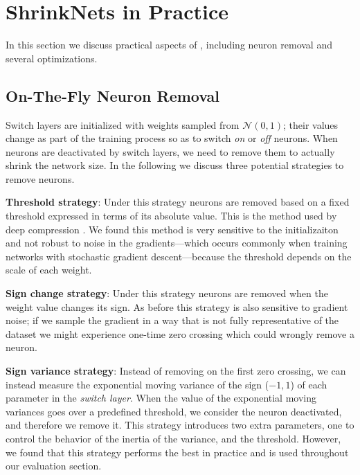 
\section{ShrinkNets in Practice}

In this section we discuss practical aspects of \shrink{}, including 
neuron removal  and several optimizations.

\subsection{On-The-Fly Neuron Removal}
\label{neuron_killing}

Switch layers are initialized with weights sampled from $\mathcal{N}(0,1)$;
their values change as part of the training process so as to switch \emph{on}
or \emph{off} neurons. When neurons are deactivated by switch layers, we need
to remove them to actually shrink the network size.
In the following we discuss three potential strategies to remove neurons. 

\textbf{Threshold strategy}: Under this strategy neurons are removed based on
a fixed threshold expressed in terms of its absolute value. This is the method
used by deep compression \cite{Han2015}. We found this method is very sensitive to the initializaiton 
and not robust to noise in the gradients---which occurs commonly when training networks with
stochastic gradient descent---because the threshold depends on the scale of
each weight.

\textbf{Sign change strategy}: Under this strategy neurons are removed when the
weight value changes its sign. As before this strategy is also sensitive to gradient noise; if we sample the gradient in a way that is not fully representative of the dataset we might experience one-time zero crossing which could wrongly remove a neuron.

\textbf{Sign variance strategy}: Instead of removing on the first zero
crossing, we can instead measure the exponential moving variance of the sign
($-1, 1$) of each parameter in the \textit{switch layer}. When the value of
the exponential moving variances goes over a predefined threshold, we consider
the neuron deactivated, and therefore we remove it. This strategy introduces
two extra parameters, one to control the behavior of the inertia of the
variance, and the threshold. 
However, we found that this strategy performs the best in practice and is used throughout our evaluation section. 

